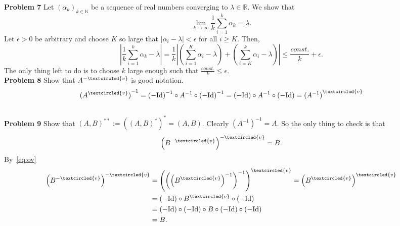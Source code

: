 \documentclass{scrartcl}
\newcommand{\N}{\mathbb{N}}
\newcommand{\R}{\mathbb{R}}
\theoremstyle{plain}
\theoremstyle{remark}
\newcommand{\Id}{\textup{Id}}
\newcommand{\ov}{\textcircled{v}}
\begin{document}
\textbf{Problem 7} Let ${(\alpha_{k})}_{k \in \N}$ be a sequence of real numbers converging to $\lambda \in \R$. We show that
\begin{equation}
  \lim_{k \to \infty} \frac{1}{k} \sum_{i=1}^{k} \alpha_{k} = \lambda.
\end{equation}
Let $\epsilon>0$ be arbitrary and choose $K$ so large that $\lvert \alpha_{i} - \lambda \rvert < \epsilon$ for all $i\ge K$. Then,
\begin{equation}
  \left\lvert \frac{1}{k} \sum_{i=1}^{k} \alpha_{k} - \lambda \right\rvert = \frac{1}{k} \left\lvert \left(\sum_{i=1}^{K} \alpha_{i} - \lambda\right) + \left( \sum_{i=K}^{k} \alpha_{i} - \lambda \right) \right\rvert \le \frac{const.}{k} + \epsilon.
\end{equation}
The only thing left to do is to choose $k$ large enough such that $\frac{const.}{k} \le \epsilon$.\\

\textbf{Problem 8} Show that $A^{-\ov}$ is good notation.
\begin{equation}
  \label{eq:ov}
  {(A^{\ov})}^{-1} = {(-\Id)}^{-1} \circ A^{-1} \circ {(-\Id)}^{-1} = (-\Id) \circ A^{-1} \circ (-\Id) = {(A^{-1})}^{\ov}
\end{equation}\\

\textbf{Problem 9} Show that ${(A, B)}^{**} := {({(A, B)}^*)}^* = {(A, B)}$.
Clearly ${(A^{-1})}^{-1} = A$. So the only thing to check is that
\begin{equation}
  {\left(B^{-\ov}\right)}^{-\ov} = B.
\end{equation}
By~\eqref{eq:ov}
\begin{equation}
  \begin{aligned}
    {\left(B^{-\ov}\right)}^{-\ov} &= {\left({\left({\left(B^{\ov}\right)}^{-1}\right)}^{-1}\right)}^{\ov} = {\left(B^{\ov}\right)}^{\ov}\\
    &= {(-\Id)} \circ B^{\ov} \circ {(-\Id)} \\
    &= {(-\Id)} \circ {(-\Id)} \circ B \circ {(-\Id)} \circ {(-\Id)} \\
    &= B.
  \end{aligned}
\end{equation}\\
\end{document}
